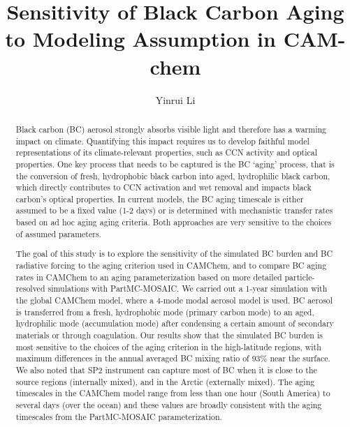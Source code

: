 \documentclass[12pt, fullpage]{uiucthesis2009_2}
\begin{document}
\setcounter{page}{1}

\title{Sensitivity of Black Carbon Aging to Modeling Assumption in CAM-chem}
\author{Yinrui Li}
\msthesis
{}
\maketitle

\frontmatter
\setcounter{page}{2}
\begin{abstract}
Black carbon (BC) aerosol strongly absorbs visible light and therefore has a warming impact on climate. Quantifying this impact requires us to develop faithful model representations of its climate-relevant properties, such as CCN activity and optical properties. One key process that needs to be captured is the BC ‘aging’ process, that is the conversion of fresh, hydrophobic black carbon into aged, hydrophilic black carbon, which directly contributes to CCN activation and wet removal and impacts black carbon’s optical properties. In current models, the BC aging timescale is either assumed to be a fixed value (1-2 days) or is determined with mechanistic transfer rates based on ad hoc aging aging criteria. Both approaches are very sensitive to the choices of assumed parameters. 

The goal of this study is to explore the sensitivity of the simulated BC burden and BC radiative forcing to the aging criterion used in CAMChem, and to compare BC aging rates in CAMChem to an aging parameterization based on more detailed particle-resolved simulations with PartMC-MOSAIC. We carried out a 1-year simulation with the global CAMChem model, where a 4-mode modal aerosol model is used. BC aerosol is transferred from a fresh, hydrophobic mode (primary carbon mode) to an aged, hydrophilic mode (accumulation mode) after condensing a certain amount of secondary materials or through coagulation. Our results show that the simulated BC burden is most sensitive to the choices of the aging criterion in the high-latitude regions, with maximum differences in the annual averaged BC mixing ratio of 93$\%$ near the surface. We also noted that SP2 instrument can capture most of BC when it is close to the source regions (internally mixed), and in the Arctic (externally mixed). The aging timescales in the CAMChem model range from less than one hour (South America) to several days (over the ocean) and these values are broadly consistent with the aging timescales from the PartMC-MOSAIC parameterization.


\end{abstract}
\end{document}
